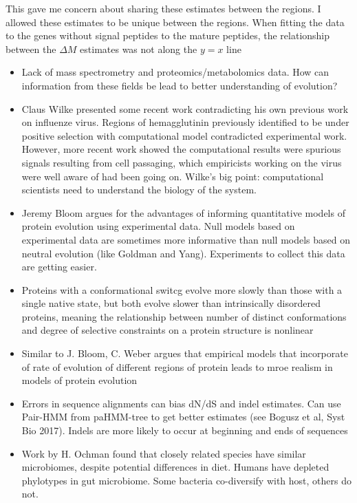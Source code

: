 \documentclass[11pt]{labbook}
\begin{document}
This gave me concern about sharing these estimates between the regions. I allowed these estimates to be unique between the regions. When fitting the data to the genes without signal peptides to the mature peptides, the relationship between the $\Delta\mathit{M}$ estimates was not along the $y = x$ line


\begin{itemize}
\item Lack of mass spectrometry and proteomics/metabolomics data. How can information from these fields be lead to better understanding of evolution?
\item Claus Wilke presented some recent work contradicting his own previous work on influenze virus. Regions of hemagglutinin previously identified to be under positive selection with computational model contradicted experimental work. However, more recent work showed the computational results were spurious signals resulting from cell passaging, which empiricists working on the virus were well aware of had been going on. Wilke's big point: computational scientists need to understand the biology of the system. 
\item Jeremy Bloom argues for the advantages of informing quantitative models of protein evolution using experimental data. Null models based on experimental data are sometimes more informative than null models based on neutral evolution (like Goldman and Yang). Experiments to collect this data are getting easier.
\item Proteins with a conformational switcg evolve more slowly than those with a single native state, but both evolve slower than intrinsically disordered proteins, meaning the relationship between number of distinct conformations and degree of selective constraints on a protein structure is nonlinear
\item Similar to J. Bloom, C. Weber argues that empirical models that incorporate of rate of evolution of different regions of protein leads to mroe realism in models of protein evolution
\item Errors in sequence alignments can bias dN/dS and indel estimates. Can use Pair-HMM from paHMM-tree to get better estimates (see Bogusz et al, Syst Bio 2017). Indels are more likely to occur at beginning and ends of sequences
\item Work by H. Ochman found that closely related species have similar microbiomes, despite potential differences in diet. Humans have depleted phylotypes in gut microbiome. Some bacteria co-diversify with host, others do not.

\end{itemize}
\end{document}
